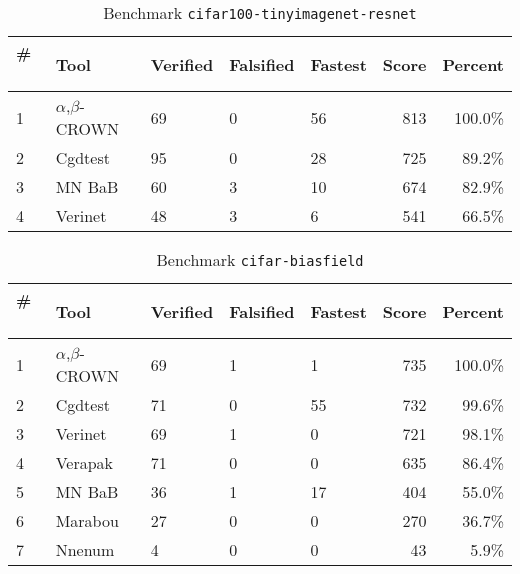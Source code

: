 
\begin{table}[h]
\begin{center}
\caption{Benchmark \texttt{cifar100-tinyimagenet-resnet}} \label{tab:cat_{cat}}
{\setlength{\tabcolsep}{2pt}
\begin{tabular}[h]{@{}lllllrr@{}}
\toprule
\textbf{\# ~} & \textbf{Tool} & \textbf{Verified} & \textbf{Falsified} & \textbf{Fastest} & \textbf{Score} & \textbf{Percent}\\
\midrule
1 & $\alpha$,$\beta$-CROWN & 69 & 0 & 56 & 813 & 100.0\% \\
2 & Cgdtest & 95 & 0 & 28 & 725 & 89.2\% \\
3 & MN BaB & 60 & 3 & 10 & 674 & 82.9\% \\
4 & Verinet & 48 & 3 & 6 & 541 & 66.5\% \\
\bottomrule
\end{tabular}
}
\end{center}
\end{table}




\begin{table}[h]
\begin{center}
\caption{Benchmark \texttt{cifar-biasfield}} \label{tab:cat_{cat}}
{\setlength{\tabcolsep}{2pt}
\begin{tabular}[h]{@{}lllllrr@{}}
\toprule
\textbf{\# ~} & \textbf{Tool} & \textbf{Verified} & \textbf{Falsified} & \textbf{Fastest} & \textbf{Score} & \textbf{Percent}\\
\midrule
1 & $\alpha$,$\beta$-CROWN & 69 & 1 & 1 & 735 & 100.0\% \\
2 & Cgdtest & 71 & 0 & 55 & 732 & 99.6\% \\
3 & Verinet & 69 & 1 & 0 & 721 & 98.1\% \\
4 & Verapak & 71 & 0 & 0 & 635 & 86.4\% \\
5 & MN BaB & 36 & 1 & 17 & 404 & 55.0\% \\
6 & Marabou & 27 & 0 & 0 & 270 & 36.7\% \\
7 & Nnenum & 4 & 0 & 0 & 43 & 5.9\% \\
\bottomrule
\end{tabular}
}
\end{center}
\end{table}




